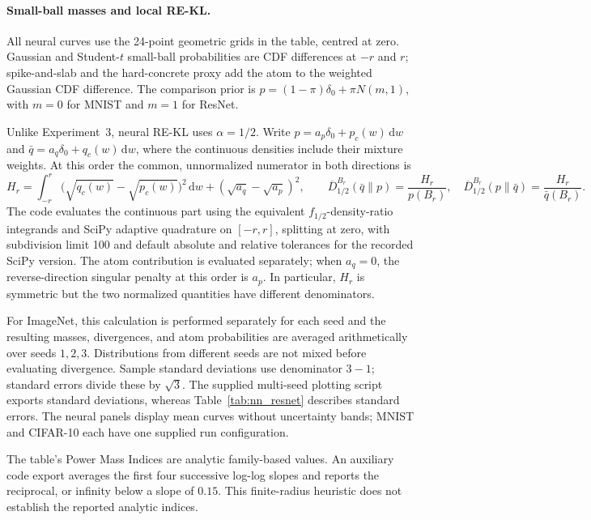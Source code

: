 \documentclass[11pt,a4paper]{article}
\theoremstyle{compactplain}
\theoremstyle{compactdefinition}
\numberwithin{equation}{section}
\begin{document}
\paragraph{Small-ball masses and local RE-KL.}
All neural curves use the 24-point geometric grids in the table,
centred at zero. Gaussian and Student-\(t\) small-ball probabilities
are CDF differences at \(-r\) and \(r\); spike-and-slab and the
hard-concrete proxy add the atom to the weighted Gaussian CDF
difference. The comparison prior is
\(p=(1-\pi)\delta_0+\pi N(m,1)\), with \(m=0\) for MNIST and
\(m=1\) for ResNet.

Unlike Experiment~3, neural RE-KL uses \(\alpha=1/2\). Write
\(p=a_p\delta_0+p_c(w)\,\mathrm dw\) and
\(\bar q=a_q\delta_0+q_c(w)\,\mathrm dw\), where the continuous
densities include their mixture weights. At this order the common,
unnormalized numerator in both directions is
\[
 H_r=\int_{-r}^{r}
       \bigl(\sqrt{q_c(w)}-\sqrt{p_c(w)}\bigr)^2\,\mathrm dw
       +(\sqrt{a_q}-\sqrt{a_p})^2,
 \qquad
 \overline D_{1/2}^{B_r}(\bar q\|p)=\frac{H_r}{p(B_r)},
 \quad
 \overline D_{1/2}^{B_r}(p\|\bar q)=\frac{H_r}{\bar q(B_r)}.
\]
The code evaluates the continuous part using the equivalent
\(f_{1/2}\)-density-ratio integrands and SciPy adaptive quadrature on
\([-r,r]\), splitting at zero, with subdivision limit 100 and default
absolute and relative tolerances for the recorded SciPy version.
The atom contribution is evaluated
separately; when \(a_q=0\), the reverse-direction singular penalty
at this order is \(a_p\). In particular, \(H_r\) is symmetric but the
two normalized quantities have different denominators.

For ImageNet, this calculation is performed separately for each seed
and the resulting masses, divergences, and atom probabilities are
averaged arithmetically over seeds \(1,2,3\). Distributions from
different seeds are not mixed before evaluating divergence. Sample
standard deviations use denominator \(3-1\); standard errors divide
these by \(\sqrt3\). The supplied multi-seed plotting script exports
standard deviations, whereas Table~\ref{tab:nn_resnet} describes standard errors.
The neural panels display mean curves without uncertainty bands;
MNIST and CIFAR-10 each have one supplied run configuration.

The table's Power Mass Indices are analytic family-based values. An
auxiliary code export averages the first four successive log-log
slopes and reports the reciprocal, or infinity below a slope of
\(0.15\). This finite-radius heuristic does not establish the
reported analytic indices.
\end{document}
